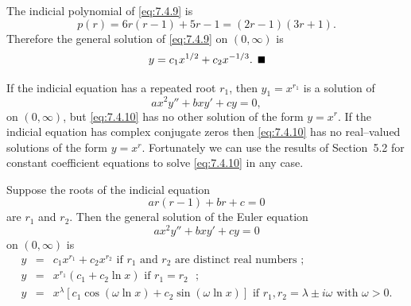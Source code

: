\begin{examplesolution}
\solution The indicial polynomial of \eqref{eq:7.4.9} is
\[
  p(r)=6r(r-1)+5r-1=(2r-1)(3r+1).
\]
Therefore the general solution of \eqref{eq:7.4.9} on $(0,\infty)$ is
\[
  y=c_{1}x^{1/2}+c_{2}x^{-1/3}.\bbox
\]
\end{examplesolution}

If the indicial equation has a repeated root $r_{1}$, then $y_{1}=x^{r_{1}}$ is a solution of
\begin{equation}
  \label{eq:7.4.10}ax^{2}y''+bxy'+cy=0,
\end{equation}
on $(0,\infty)$, but \eqref{eq:7.4.10} has no other solution of the form $y=x^{r}$. If the indicial
equation has complex conjugate zeros then \eqref{eq:7.4.10} has no real--valued solutions of the
form $y=x^{r}$. Fortunately we can use the results of Section~5.2 for constant coefficient equations
to solve \eqref{eq:7.4.10} in any case.

\begin{theorem}
  \color{blue}
  \label{thmtype:7.4.3} Suppose the roots of the indicial equation
  \begin{equation}
    \label{eq:7.4.11}ar(r-1)+br+c=0
  \end{equation}
  are $r_{1}$ and $r_{2}$. Then the general solution of the Euler equation
  \begin{equation}
    \label{eq:7.4.12}ax^{2}y''+bxy'+cy=0
  \end{equation}
  on $(0,\infty)$ is
  \begin{eqnarray*}
    y & = & c_{1}x^{r_{1}}+c_{2}x^{r_{2}}\mbox{ if $r_{1}$ and $r_{2}$ are distinct real numbers }; \\
    y & = & x^{r_{1}}(c_{1}+c_{2}\ln x)\mbox{ if $r_{1}=r_{2}$ };                                   \\
    y & = & x^{\lambda}\left[c_{1}\cos\left(\omega\ln x\right)+c_{2}\sin\left(\omega\ln x\right)\right]\mbox{ if $r_{1},r_{2}=\lambda\pm i\omega$ with $\omega>0$}.
  \end{eqnarray*}
\end{theorem}


